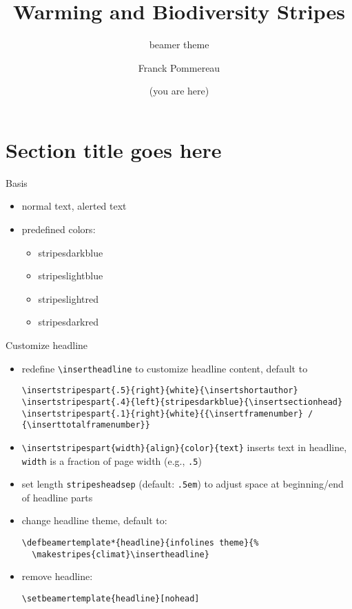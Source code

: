 \documentclass[aspectratio=169]{beamer}
\begin{document}
\title{Warming and Biodiversity Stripes}
\subtitle{beamer theme}
\author{Franck Pommereau}
\date{\color{stripesdarkred}(you are here)}

\maketitle

\section{Section title goes here}

\begin{frame}[fragile]{Basis}
  \begin{itemize}
    \item normal text, \alert{alerted text}
    \item predefined colors:
    \begin{itemize}
      \item {\color{stripesdarkblue}stripesdarkblue}
      \item {\color{stripeslightblue}stripeslightblue}
      \item {\color{stripeslightred}stripeslightred}
      \item {\color{stripesdarkred}stripesdarkred}
    \end{itemize}
  \end{itemize}
\end{frame}

\begin{frame}[fragile]{Customize headline}
  \begin{itemize}
    \item redefine \Verb|\insertheadline| to customize headline content, default to
      \begin{Verbatim}[fontsize=\relsize{-2}]
\insertstripespart{.5}{right}{white}{\insertshortauthor}
\insertstripespart{.4}{left}{stripesdarkblue}{\insertsectionhead}
\insertstripespart{.1}{right}{white}{{\insertframenumber} / {\inserttotalframenumber}}
      \end{Verbatim}
    \item \Verb|\insertstripespart{width}{align}{color}{text}|
      inserts text in headline, \Verb|width| is a fraction of page width (e.g., \Verb|.5|)
    \item set length \Verb|stripesheadsep| (default: \texttt{.5em})
      to adjust space at beginning/end of headline parts
    \item change headline theme, default to:
      \begin{Verbatim}[fontsize=\relsize{-2}]
\defbeamertemplate*{headline}{infolines theme}{%
  \makestripes{climat}\insertheadline}
      \end{Verbatim}
    \item remove headline:
      \begin{Verbatim}[fontsize=\relsize{-2}]
\setbeamertemplate{headline}[nohead]
      \end{Verbatim}
  \end{itemize}
\end{frame}
\end{document}
